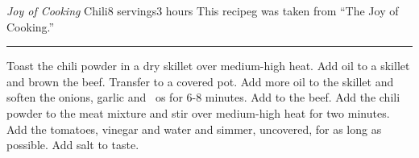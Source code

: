 \begin{recipe}{\textit{Joy of Cooking} Chili}{8 servings}{3 hours}
\freeform This recipeg was taken from ``The Joy of Cooking.''\\
\rule{\textwidth}{0.05pt}
Toast the chili powder in a dry skillet over medium-high heat.
Add oil to a skillet and brown the beef.  Transfer to a covered pot. 
Add more oil to the skillet and soften the onions, garlic and ~os for 6-8 minutes.  Add to the beef.
\newstep
Add the chili powder to the meat mixture and stir over medium-high heat for two minutes.
Add the tomatoes, vinegar and water and simmer, uncovered, for as long as possible.  Add salt to taste.
\end{recipe}
